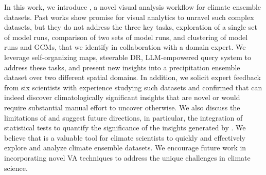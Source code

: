 In this work, we introduce \ClimateSOM, a novel visual analysis workflow for climate ensemble datasets.
%
Past works show promise for visual analytics to unravel such complex datasets, but they do not address the three key tasks, exploration of a single set of model runs, comparison of two sets of model runs, and clustering of model runs and GCMs, that we identify in collaboration with a domain expert.
%
We leverage self-organizing maps, steerable DR, LLM-empowered query system to address these tasks, and present new insights into a precipitation ensemble dataset over two different spatial domains.
%
In addition, we solicit expert feedback from six scientists with experience studying such datasets and confirmed that \ClimateSOM can indeed discover climatologically significant insights that are novel or would require substantial manual effort to uncover otherwise.
%
We also discuss the limitations of \ClimateSOM and suggest future directions, in particular, the integration of statistical tests to quantify the significance of the insights generated by \ClimateSOM.
%
We believe that \ClimateSOM is a valuable tool for climate scientists to quickly and effectively explore and analyze climate ensemble datasets.
%
We encourage future work in incorporating novel VA techniques to address the unique challenges in climate science.
